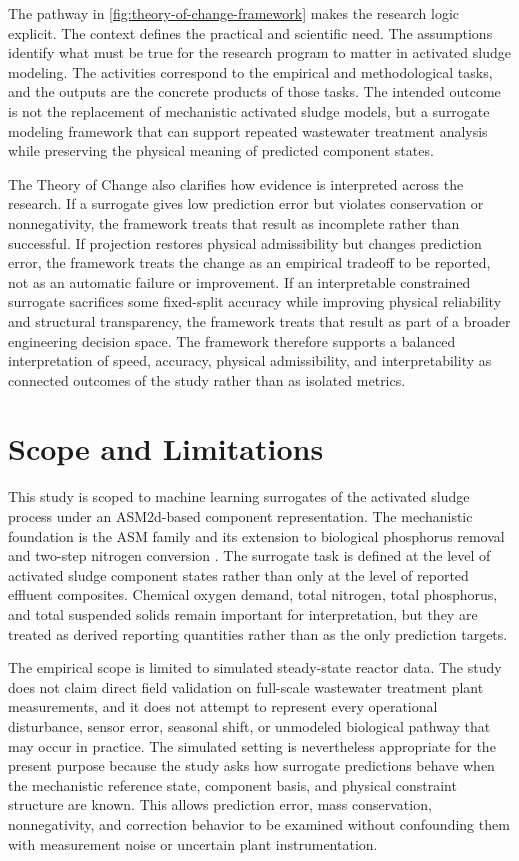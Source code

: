 \documentclass[12pt, twoside]{book}
\begin{document}
The pathway in \cref{fig:theory-of-change-framework} makes the research logic explicit. The context
defines the practical and scientific need. The assumptions identify what must be true for the research program
to matter in activated sludge modeling. The activities correspond to the empirical and methodological tasks,
and the outputs are the concrete products of those tasks. The intended outcome is not the replacement of mechanistic
activated sludge models, but a surrogate modeling framework that can support repeated wastewater treatment
analysis while preserving the physical meaning of predicted component states.

The Theory of Change also clarifies how evidence is interpreted across the research. If a surrogate gives
low prediction error but violates conservation or nonnegativity, the framework treats that result as
incomplete rather than successful. If projection restores physical admissibility but changes prediction error,
the framework treats the change as an empirical tradeoff to be reported, not as an automatic failure or
improvement. If an interpretable constrained surrogate sacrifices some fixed-split accuracy while improving
physical reliability and structural transparency, the framework treats that result as part of a broader
engineering decision space. The framework therefore supports a balanced interpretation of speed, accuracy,
physical admissibility, and interpretability as connected outcomes of the study rather than as isolated
metrics.

\section{Scope and Limitations}

This study is scoped to machine learning surrogates of the activated sludge process under an
ASM2d-based component representation. The mechanistic foundation is the ASM family and its extension to
biological phosphorus removal and two-step nitrogen conversion \citep{Henze1999,Henze2006,Guerrero2011}. The
surrogate task is defined at the level of activated sludge component states rather than only at the level of
reported effluent composites. Chemical oxygen demand, total nitrogen, total phosphorus, and total suspended
solids remain important for interpretation, but they are treated as derived reporting quantities rather than as
the only prediction targets.

The empirical scope is limited to simulated steady-state reactor data. The study does not claim direct
field validation on full-scale wastewater treatment plant measurements, and it does not attempt to represent
every operational disturbance, sensor error, seasonal shift, or unmodeled biological pathway that may occur in
practice. The simulated setting is nevertheless appropriate for the present purpose because the study
asks how surrogate predictions behave when the mechanistic reference state, component basis, and physical
constraint structure are known. This allows prediction error, mass conservation, nonnegativity, and correction
behavior to be examined without confounding them with measurement noise or uncertain plant instrumentation.
\end{document}
